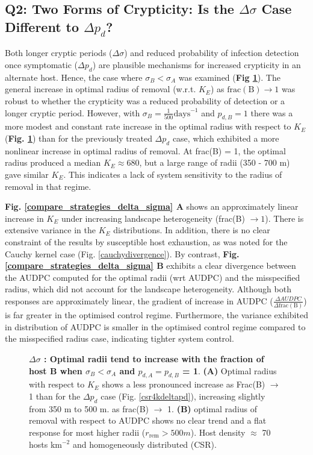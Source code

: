 \documentclass[11pt,letterpaper]{article}
\begin{document}
{ \FloatBarrier
 \subsection*{Q2: Two Forms of Crypticity: Is the $\Delta \sigma$ Case Different to $\Delta p_{d}$?}

  
 Both longer cryptic periods ($\Delta \sigma$) and reduced probability of infection detection once symptomatic ($\Delta p_{d}$) are plausible mechanisms for increased crypticity in an alternate host. Hence, the case where $\sigma_{B} < \sigma_{A}$ was examined (\textbf{Fig \ref{sigma4kcsrsym}}). The general increase in optimal radius of removal (w.r.t. $K_E$) as $\mathrm{frac(B)} \rightarrow 1$ was robust to whether the crypticity was a reduced probability of detection or a longer cryptic period.
However, with $\sigma_{B} = \frac{1}{500} \mathrm{days}^{-1}$ and $ p_{d,B} = 1$ there was a more modest and constant rate increase in the optimal radius with respect to $K_E$ (\textbf{Fig. \ref{sigma4kcsrsym}}) than for the previously treated $\Delta p_{d}$ case, which exhibited a more nonlinear increase in optimal radius of removal. At frac(B) = 1, the optimal radius produced a median $K_E \approx 680$, but a large range of radii (350 - 700 m) gave similar $K_E$. This indicates a lack of system sensitivity to the radius of removal in that regime. 

\textbf{Fig. \ref{compare_strategies_delta_sigma} A} shows an approximately linear increase in $K_E$ under increasing landscape heterogeneity (frac(B) $\rightarrow 1$). There is extensive variance in the $K_E$ distributions. In addition, there is no clear constraint of the results by susceptible host exhaustion, as was noted for the Cauchy kernel case (Fig. \ref{cauchydivergence}). By contrast, \textbf{Fig. \ref{compare_strategies_delta_sigma} B} exhibits a clear divergence between the AUDPC computed for the optimal radii (wrt AUDPC) and the misspecified radius, which did not account for the landscape heterogeneity. Although both responses are approximately linear, the gradient of increase in AUDPC ($\frac{\Delta AUDPC}{\Delta \mathrm{frac(B)}}$) is far greater in the optimised control regime. Furthermore, the variance exhibited in distribution of AUDPC is smaller in the optimised control regime compared to the misspecified radius case, indicating tighter system control. 

\begin{figure}
	\centering

\caption{\label{sigma4kcsrsym} \textbf{ $\Delta \sigma$ : Optimal radii tend to increase with the fraction of host B  when $\sigma_B < \sigma_A$ and \textbf{$p_{d,A} = p_{d,B}$} = 1}. \textbf{(A)} Optimal radius with respect to $K_E$  shows a less pronounced increase as Frac(B) $\rightarrow$ 1 than for the $\Delta p_{d}$  case (Fig. \ref{csr4kdeltapd}), increasing slightly from 350 m to 500 m. as frac(B) $\rightarrow$ 1. \textbf{(B)} optimal radius of removal with respect to AUDPC shows no clear trend and a flat response for most higher radii ($r_{\mathrm{rem}} > 500m$). Host density $\approx$ 70 hosts km$^{-2}$ and homogeneously distributed (CSR).}
\end{figure}

}
\end{document}
